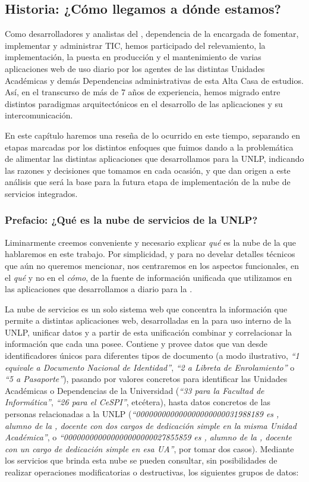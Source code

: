 \subsection{Historia: ¿Cómo llegamos a dónde estamos?}
\label{nube:historia}

Como desarrolladores y analistas del {\cespi}, dependencia de la {\unlp} encargada de fomentar, implementar y administrar TIC, hemos participado del relevamiento, la implementación, la puesta en producción y el mantenimiento de varias aplicaciones web de uso diario por los agentes de las distintas Unidades Académicas y demás Dependencias administrativas de esta Alta Casa de estudios. Así, en el transcurso de más de 7 años de experiencia, hemos migrado entre distintos paradigmas arquitectónicos en el desarrollo de las aplicaciones y su intercomunicación.

En este capítulo haremos una reseña de lo ocurrido en este tiempo, separando en etapas marcadas por los distintos enfoques que fuimos dando a la problemática de alimentar las distintas aplicaciones que desarrollamos para la UNLP, indicando las razones y decisiones que tomamos en cada ocasión, y que dan origen a este análisis que será la base para la futura etapa de implementación de la nube de servicios integrados.


\subsubsection{Prefacio: ¿Qué es la nube de servicios de la UNLP?}
\label{nube:prefacio}

Liminarmente creemos conveniente y necesario explicar \textit{qué} es la nube de la que hablaremos en este trabajo. Por simplicidad, y para no develar detalles técnicos que aún no queremos mencionar, nos centraremos en los aspectos funcionales, en el \textit{qué} y no en el \textit{cómo}, de la fuente de información unificada que utilizamos en las aplicaciones que desarrollamos a diario para la {\unlp}.

La nube de servicios es un solo sistema web que concentra la información que permite a distintas aplicaciones web, desarrolladas en la {\direccionDesarrollo} para uso interno de la UNLP, unificar datos y a partir de esta unificación combinar y correlacionar la información que cada una posee. Contiene y provee datos que van desde identificadores únicos para diferentes tipos de documento (a modo ilustrativo, \textit{“1 equivale a Documento Nacional de Identidad”}, \textit{“2 a Libreta de Enrolamiento”} o \textit{“5 a Pasaporte”}), pasando por valores concretos para identificar las Unidades Académicas o Dependencias de la Universidad (\textit{“33 para la Facultad de Informática”}, \textit{“26 para el CeSPI”}, etcétera), hasta datos concretos de las personas relacionadas a la UNLP (\textit{“000000000000000000000031988189 es \nahuelcuesta, alumno de la \facultad, docente con dos cargos de dedicación simple en la misma Unidad Académica”}, o \textit{“000000000000000000000027855859 es \miguelcarbone, alumno de la \facultad, docente con un cargo de dedicación simple en esa UA”}, por tomar dos casos). Mediante los servicios que brinda esta nube se pueden consultar, sin posibilidades de realizar operaciones modificatorias o destructivas, los siguientes grupos de datos:

